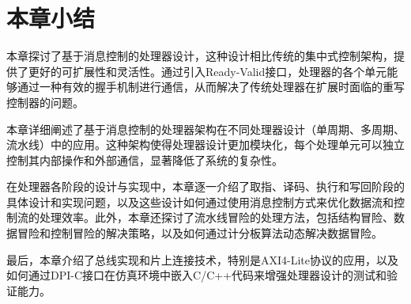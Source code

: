 \section{本章小结}

本章探讨了基于消息控制的处理器设计，这种设计相比传统的集中式控制架构，提供了更好的可扩展性和灵活性。通过引入Ready-Valid接口，处理器的各个单元能够通过一种有效的握手机制进行通信，从而解决了传统处理器在扩展时面临的重写控制器的问题。

本章详细阐述了基于消息控制的处理器架构在不同处理器设计（单周期、多周期、流水线）中的应用。这种架构使得处理器设计更加模块化，每个处理单元可以独立控制其内部操作和外部通信，显著降低了系统的复杂性。

在处理器各阶段的设计与实现中，本章逐一介绍了取指、译码、执行和写回阶段的具体设计和实现问题，以及这些设计如何通过使用消息控制方式来优化数据流和控制流的处理效率。此外，本章还探讨了流水线冒险的处理方法，包括结构冒险、数据冒险和控制冒险的解决策略，以及如何通过计分板算法动态解决数据冒险。

最后，本章介绍了总线实现和片上连接技术，特别是AXI4-Lite协议的应用，以及如何通过DPI-C接口在仿真环境中嵌入C/C++代码来增强处理器设计的测试和验证能力。
